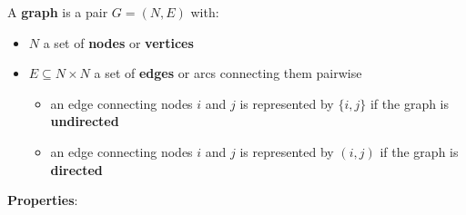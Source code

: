 \documentclass[english]{article}
\begin{document}
A \textbf{graph} is a pair \(G = (N, E)\) with:

\begin{itemize}
  \item \(N\) a set of \textbf{nodes} or \textbf{vertices}
  \item \(E \subseteq N \times N\) a set of \textbf{edges} or arcs connecting them pairwise
        \begin{itemize}
          \item an edge connecting nodes \(i\) and \(j\) is represented by \(\{i, j\}\) if the graph is \textbf{undirected}
          \item an edge connecting nodes \(i\) and \(j\) is represented by \((i, j)\) if the graph is \textbf{directed}
        \end{itemize}
\end{itemize}

\bigskip
\textbf{Properties}:
\end{document}
